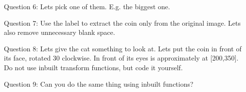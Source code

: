 \documentclass[12pt,a4paper]{article}
\begin{document}
Question 6: Lets pick one of them. E.g. the biggest one.

Question 7: Use the label to extract the coin only from the original image. Lets also remove unnecessary blank space.

Question 8: Lets give the cat something to look at. Lets put the coin in front of its face, rotated 30 clockwise. In front of its eyes is approximately at [200,350]. Do not use inbuilt transform functions, but code it yourself.

Question 9: Can you do the same thing using inbuilt functions?
\end{document}
